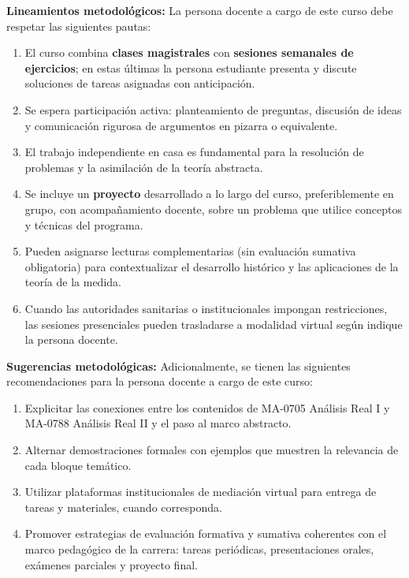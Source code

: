 \begin{refsection}
\noindent \textbf{Lineamientos metodológicos:} La persona docente a cargo de este curso debe respetar las siguientes pautas:

\begin{enumerate}
    \item El curso combina \textbf{clases magistrales} con \textbf{sesiones semanales de ejercicios}; en estas últimas la persona estudiante presenta y discute soluciones de tareas asignadas con anticipación.
    \item Se espera participación activa: planteamiento de preguntas, discusión de ideas y comunicación rigurosa de argumentos en pizarra o equivalente.
    \item El trabajo independiente en casa es fundamental para la resolución de problemas y la asimilación de la teoría abstracta.
    \item Se incluye un \textbf{proyecto} desarrollado a lo largo del curso, preferiblemente en grupo, con acompañamiento docente, sobre un problema que utilice conceptos y técnicas del programa.
    \item Pueden asignarse lecturas complementarias (sin evaluación sumativa obligatoria) para contextualizar el desarrollo histórico y las aplicaciones de la teoría de la medida.
    \item Cuando las autoridades sanitarias o institucionales impongan restricciones, las sesiones presenciales pueden trasladarse a modalidad virtual según indique la persona docente.
\end{enumerate}

\textbf{Sugerencias metodológicas:} Adicionalmente, se tienen las siguientes recomendaciones para la persona docente a cargo de este curso:

\begin{enumerate}
    \item Explicitar las conexiones entre los contenidos de MA-0705 Análisis Real I y MA-0788 Análisis Real II y el paso al marco abstracto.
    \item Alternar demostraciones formales con ejemplos que muestren la relevancia de cada bloque temático.
    \item Utilizar plataformas institucionales de mediación virtual para entrega de tareas y materiales, cuando corresponda.
    \item Promover estrategias de evaluación formativa y sumativa coherentes con el marco pedagógico de la carrera: tareas periódicas, presentaciones orales, exámenes parciales y proyecto final.

\end{enumerate}

\nocite{Bog20}
\nocite{BBT08}
\nocite{Fol99}
\nocite{Lie01}
\nocite{RF10}
\nocite{SS05}
\nocite{Vil03}

\printcursosbibliography
\end{refsection}
